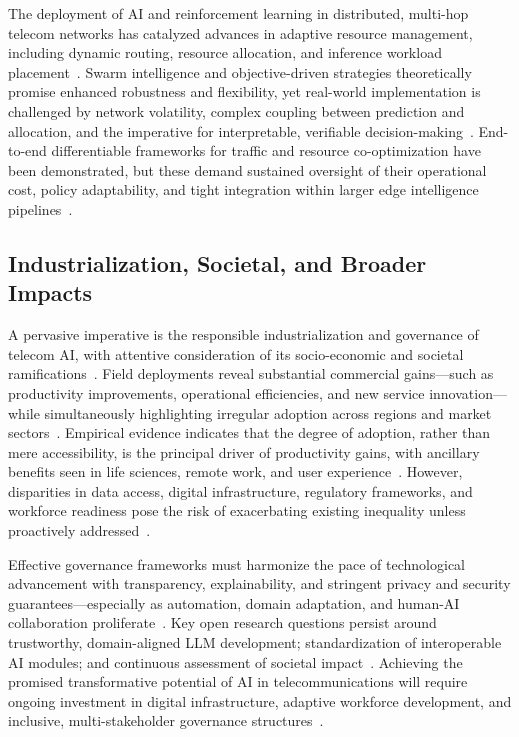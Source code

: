 \documentclass[sigconf]{acmart}
\begin{document}
The deployment of AI and reinforcement learning in distributed, multi-hop telecom networks has catalyzed advances in adaptive resource management, including dynamic routing, resource allocation, and inference workload placement~\cite{ref48}. Swarm intelligence and objective-driven strategies theoretically promise enhanced robustness and flexibility, yet real-world implementation is challenged by network volatility, complex coupling between prediction and allocation, and the imperative for interpretable, verifiable decision-making~\cite{ref48}. End-to-end differentiable frameworks for traffic and resource co-optimization have been demonstrated, but these demand sustained oversight of their operational cost, policy adaptability, and tight integration within larger edge intelligence pipelines~\cite{ref48}.

\subsection{Industrialization, Societal, and Broader Impacts}

A pervasive imperative is the responsible industrialization and governance of telecom AI, with attentive consideration of its socio-economic and societal ramifications~\cite{ref6, ref8, ref19, ref26, ref29, ref49}. Field deployments reveal substantial commercial gains—such as productivity improvements, operational efficiencies, and new service innovation—while simultaneously highlighting irregular adoption across regions and market sectors~\cite{ref6, ref8, ref29}. Empirical evidence indicates that the degree of adoption, rather than mere accessibility, is the principal driver of productivity gains, with ancillary benefits seen in life sciences, remote work, and user experience~\cite{ref6, ref19}. However, disparities in data access, digital infrastructure, regulatory frameworks, and workforce readiness pose the risk of exacerbating existing inequality unless proactively addressed~\cite{ref8, ref19}.

Effective governance frameworks must harmonize the pace of technological advancement with transparency, explainability, and stringent privacy and security guarantees—especially as automation, domain adaptation, and human-AI collaboration proliferate~\cite{ref19, ref26, ref49}. Key open research questions persist around trustworthy, domain-aligned LLM development; standardization of interoperable AI modules; and continuous assessment of societal impact~\cite{ref26, ref49}. Achieving the promised transformative potential of AI in telecommunications will require ongoing investment in digital infrastructure, adaptive workforce development, and inclusive, multi-stakeholder governance structures~\cite{ref8, ref26, ref29, ref49}.
\end{document}
